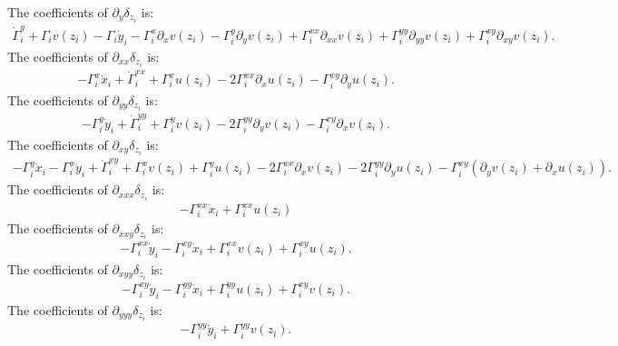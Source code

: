 \documentclass[12pt]{amsart}
\begin{document}
The coefficients of $\partial_{y}\delta_{z_i}$ is:
\begin{align*}
	\dot{\Gamma}_i^y +\Gamma_i v(z_i)-\Gamma_i \dot{y}_i - \Gamma_i^x \partial_xv(z_i) - \Gamma_i^y \partial_y v(z_i) + \Gamma_i^{xx} \partial_{xx} v(z_i) + \Gamma_i^{yy} \partial_{yy}v(z_i) + \Gamma_i^{xy} \partial_{xy} v(z_i).
\end{align*}
The coefficients of $\partial_{xx}\delta_{z_i}$ is:
\begin{align*}
	-\Gamma_i^x \dot{x}_i + \dot{\Gamma}_i^{xx} + \Gamma_i^x u(z_i) - 2 \Gamma_i^{xx} \partial_x u(z_i) - \Gamma_i^{xy} \partial_y u(z_i).
\end{align*}
The coefficients of $\partial_{yy}\delta_{z_i}$ is:
\begin{align*}
	-\Gamma_i^y \dot{y}_i + \dot{\Gamma}_i^{yy} + \Gamma_i^y v(z_i) - 2 \Gamma_i^{yy} \partial_y v(z_i) - \Gamma_i^{xy} \partial_x v(z_i).
\end{align*}
The coefficients of $\partial_{xy}\delta_{z_i}$ is:
\begin{align*}
	-\Gamma_i^y \dot{x}_i -\Gamma_i^x \dot{y}_i + \dot{\Gamma}_i^{xy} + \Gamma_i^x v(z_i) + \Gamma_i^y u(z_i) - 2 \Gamma_i^{xx} \partial_x v(z_i) - 2 \Gamma_i^{yy} \partial_y u(z_i) - \Gamma_i^{xy}( \partial_y v(z_i) + \partial_x u(z_i) ).
\end{align*}
The coefficients of $\partial_{xxx}\delta_{z_i}$ is:
\begin{align*}
	-\Gamma_i^{xx}\dot{x}_i + \Gamma_i^{xx} u(z_i)
\end{align*}
The coefficients of $\partial_{xxy}\delta_{z_i}$ is:
\begin{align*}
	-\Gamma_i^{xx}\dot{y}_i - \Gamma_i^{xy} \dot{x}_i + \Gamma_i^{xx} v(z_i) + \Gamma_i^{xy} u(z_i).
\end{align*}
The coefficients of $\partial_{xyy}\delta_{z_i}$ is:
\begin{align*}
	-\Gamma_i^{xy}\dot{y}_i - \Gamma_i^{yy} \dot{x}_i + \Gamma_i^{yy} u(z_i) + \Gamma_i^{xy} v(z_i).
\end{align*}
The coefficients of $\partial_{yyy}\delta_{z_i}$ is:
\begin{align*}
	-\Gamma_i^{yy}\dot{y}_i + \Gamma_i^{yy} v(z_i).
\end{align*}
\end{document}
